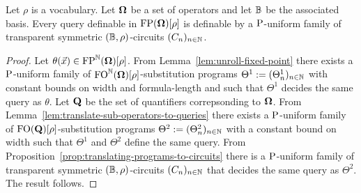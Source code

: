 \documentclass[../main/thesis.tex]{subfiles}
\begin{document}
\begin{thm}
  Let $\rho$ is a vocabulary. Let $\mathbf{\mathbf{\Omega}}$ be a set of operators and let $\mathbb{B}$
  be the associated basis. Every query definable in $\text{\upshape FP}(\mathbf{\mathbf{\Omega}})[\rho]$ is
  definable by a $\mathrm{P}$-uniform family of transparent symmetric $(\mathbb{B},
  \rho)$-circuits $(C_n)_{n \in \mathbb{N}}$.
  \label{thm:translating-FP-formulas-to-circuits}
\end{thm}
\begin{proof}
  Let $\theta(\vec{x}) \in \text{\upshape FP}^{\mathbb{N}}(\mathbf{\mathbf{\Omega}})[\rho]$. From
  Lemma~\ref{lem:unroll-fixed-point} there exists a $\mathrm{P}$-uniform family of
  $\text{\upshape FO}^{\mathbb{N}}(\mathbf{\mathbf{\Omega}})[\rho]$-substitution programs $\Theta^1 := (\Theta^1_n)_{n
    \in \mathbb{N}}$ with constant bounds on width and formula-length and such that
  $\Theta^1$ decides the same query as $\theta$. Let $\mathbf{Q}$ be the set of
  quantifiers correpsonding to $\mathbf{\mathbf{\Omega}}$. From
  Lemma~\ref{lem:translate-sub-operators-to-queries} there exists a
  $\mathrm{P}$-uniform family of $\text{\upshape FO}(\mathbf{Q})[\rho]$-substitution programs $\Theta^2
  := (\Theta^2_n)_{n \in \mathbb{N}}$ with a constant bound on width such that
  $\Theta^1$ and $\Theta^2$ define the same query. From
  Proposition~\ref{prop:translating-programs-to-circuits} there is a
  $\mathrm{P}$-uniform family of transparent symmetric $(\mathbb{B}, \rho)$-circuits $(C_n)_{n
    \in \mathbb{N}}$ that decides the same query as $\Theta^2$. The result follows.
\end{proof}



\end{document}
